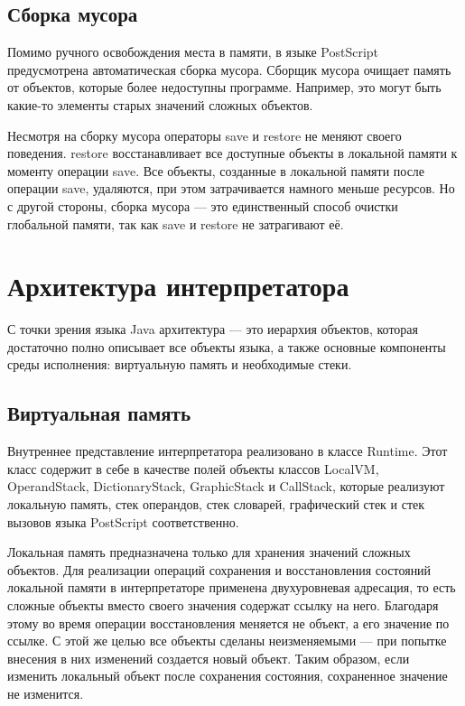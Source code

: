 \subsection{Сборка мусора}
Помимо ручного освобождения места в памяти, в языке PostScript предусмотрена автоматическая сборка мусора. Сборщик мусора очищает память от объектов, которые более недоступны программе. Например, это могут быть какие-то элементы старых значений сложных объектов.

Несмотря на сборку мусора операторы save и restore не меняют своего поведения. restore восстанавливает все доступные объекты в локальной памяти к моменту операции save. Все объекты, созданные в локальной памяти после операции save, удаляются, при этом затрачивается намного меньше ресурсов. Но с другой стороны, сборка мусора --- это единственный способ очистки глобальной памяти, так как save и restore не затрагивают её.


\section{Архитектура интерпретатора}
С точки зрения языка Java архитектура --- это иерархия объектов, которая достаточно полно описывает все объекты языка, а также основные компоненты среды исполнения: виртуальную память и необходимые стеки. 

\subsection{Виртуальная память}
Внутреннее представление интерпретатора реализовано в классе Runtime. Этот класс содержит в себе в качестве полей объекты классов LocalVM, OperandStack, DictionaryStack, GraphicStack и CallStack, которые реализуют локальную память, стек операндов, стек словарей, графический стек и стек вызовов языка PostScript соответственно.

Локальная память предназначена только для хранения значений сложных объектов. Для реализации операций сохранения и восстановления состояний локальной памяти в интерпретаторе применена двухуровневая адресация, то есть сложные объекты вместо своего значения содержат ссылку на него. Благодаря этому во время операции восстановления меняется не объект, а его значение по ссылке. С этой же целью все объекты сделаны неизменяемыми --- при попытке внесения в них изменений создается новый объект. Таким образом, если изменить локальный объект после сохранения состояния, сохраненное значение не изменится.


